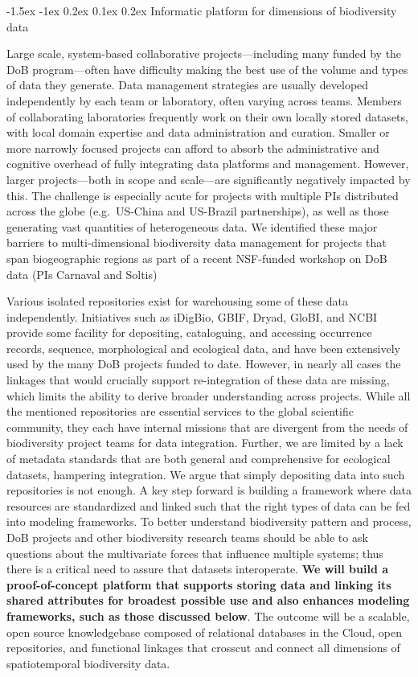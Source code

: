 \documentclass[11pt]{article}
\makeatletter
\renewcommand\subsubsection{\@startsection{subsection}{1}{\z@}%
                                  {-1.5ex \@plus -1ex \@minus 0.2ex}%
                                  {0.1ex \@plus 0.2ex}%
                                  {\normalfont\bfseries}}
\makeatother
\begin{document}
\subsubsection{Informatic platform for dimensions of biodiversity
data}\label{informatic-platform-for-dimensions-of-biodiversity-data}

Large scale, system-based collaborative projects---including many
funded by the DoB program---often have difficulty making the best use
of the volume and types of data they generate. Data management
strategies are usually developed independently by each team or
laboratory, often varying across teams. Members of collaborating
laboratories frequently work on their own locally stored datasets,
with local domain expertise and data administration and
curation. Smaller or more narrowly focused projects can afford to
absorb the administrative and cognitive overhead of fully integrating
data platforms and management. However, larger projects---both in
scope and scale---are significantly negatively impacted by this. The
challenge is especially acute for projects with multiple PIs
distributed across the globe (e.g.~US-China and US-Brazil
partnerships), as well as those generating vast quantities of
heterogeneous data. We identified these major barriers to
multi-dimensional biodiversity data management for projects that span
biogeographic regions as part of a recent NSF-funded workshop on DoB
data (PIs Carnaval and Soltis)

Various isolated repositories exist for warehousing some of these
data independently. Initiatives such as iDigBio, GBIF, Dryad, GloBI,
and NCBI provide some facility for depositing, cataloguing, and
accessing occurrence records, sequence, morphological and ecological
data, and have been extensively used by the many DoB projects funded
to date.  However, in nearly all cases the linkages that would
crucially support re-integration of these data are missing, which
limits the ability to derive broader understanding across
projects. While all the mentioned repositories are essential services
to the global scientific community, they each have internal missions
that are divergent from the needs of biodiversity project teams for
data integration. Further, we are limited by a lack of metadata standards
that are both general and comprehensive for ecological datasets,
hampering integration. We argue that simply depositing data into
such repositories is not enough. A key step forward is building a
framework where data resources are standardized and linked such that
the right types of data can be fed into modeling
frameworks. To better understand biodiversity pattern and process, DoB
projects and other biodiversity research teams should be able to ask
questions about the multivariate forces that influence multiple
systems; thus there is a critical need to assure that datasets
interoperate. \textbf{We will build a proof-of-concept platform that
  supports storing data and linking its shared attributes for broadest
  possible use and also enhances modeling frameworks, such as those
  discussed below}. The outcome will be a scalable, open source
knowledgebase composed of relational databases in the Cloud, open
repositories, and functional linkages that crosscut and connect all
dimensions of spatiotemporal biodiversity data.
\end{document}
